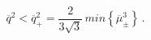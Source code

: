 \begin{equation}
\overline{q}^2<\overline{q}_+^2=\frac{2}{3\sqrt{3}}
\,min\left\{\overline{\mu}_{\pm}^3\right\}\,.\end{equation}

